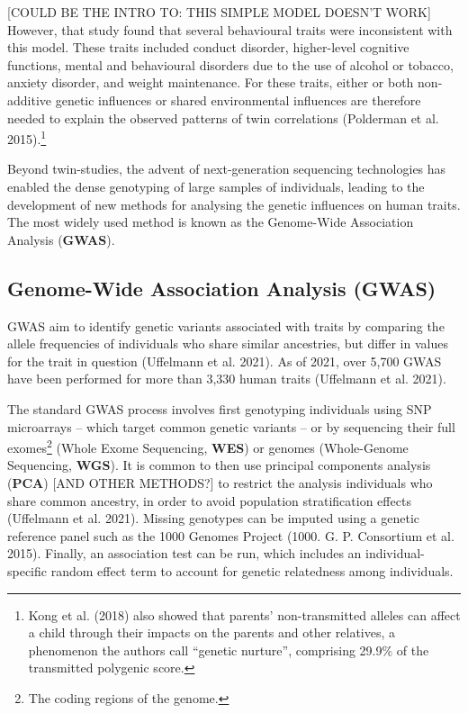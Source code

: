 \documentclass[
]{book}
\begin{document}
{[}COULD BE THE INTRO TO: THIS SIMPLE MODEL DOESN'T WORK{]} However, that study found that several behavioural traits were inconsistent with this model. These traits included conduct disorder, higher-level cognitive functions, mental and behavioural disorders due to the use of alcohol or tobacco, anxiety disorder, and weight maintenance. For these traits, either or both non-additive genetic influences or shared environmental influences are therefore needed to explain the observed patterns of twin correlations (Polderman et al. 2015).\footnote{Kong et al. (2018) also showed that parents' non-transmitted alleles can affect a child through their impacts on the parents and other relatives, a phenomenon the authors call ``genetic nurture'', comprising 29.9\% of the transmitted polygenic score.}

Beyond twin-studies, the advent of next-generation sequencing technologies has enabled the dense genotyping of large samples of individuals, leading to the development of new methods for analysing the genetic influences on human traits. The most widely used method is known as the Genome-Wide Association Analysis (\textbf{GWAS}).

\hypertarget{genome-wide-association-analysis-gwas}{%
\subsection{Genome-Wide Association Analysis (GWAS)}\label{genome-wide-association-analysis-gwas}}

GWAS aim to identify genetic variants associated with traits by comparing the allele frequencies of individuals who share similar ancestries, but differ in values for the trait in question (Uffelmann et al. 2021). As of 2021, over 5,700 GWAS have been performed for more than 3,330 human traits (Uffelmann et al. 2021).

The standard GWAS process involves first genotyping individuals using SNP microarrays -- which target common genetic variants -- or by sequencing their full exomes\footnote{The coding regions of the genome.} (Whole Exome Sequencing, \textbf{WES}) or genomes (Whole-Genome Sequencing, \textbf{WGS}). It is common to then use principal components analysis (\textbf{PCA}) {[}AND OTHER METHODS?{]} to restrict the analysis individuals who share common ancestry, in order to avoid population stratification effects (Uffelmann et al. 2021). Missing genotypes can be imputed using a genetic reference panel such as the 1000 Genomes Project (1000. G. P. Consortium et al. 2015). Finally, an association test can be run, which includes an individual-specific random effect term to account for genetic relatedness among individuals.
\end{document}
